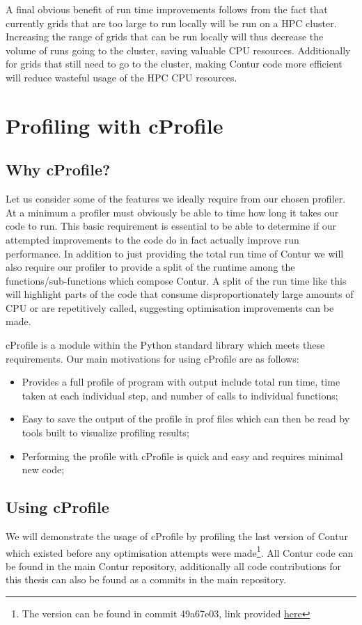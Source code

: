 A final obvious benefit of run time improvements follows from the fact that currently grids that are too large to run locally will be run on a HPC cluster. Increasing the range of grids that can be run locally will thus decrease the volume of runs going to the cluster, saving valuable CPU resources. Additionally for grids that still need to go to the cluster, making Contur code more efficient will reduce wasteful usage of the HPC CPU resources.

\section{Profiling with cProfile}

\subsection{Why cProfile?}
Let us consider some of the features we ideally require from our chosen profiler. At a minimum a profiler must obviously be able to time how long it takes our code to run. This basic requirement is essential to be able to determine if our attempted improvements to the code do in fact actually improve run performance. In addition to just providing the total run time of Contur we will also require our profiler to provide a split of the runtime among the functions/sub-functions which compose Contur. A split of the run time like this will highlight parts of the code that consume disproportionately large amounts of CPU or are repetitively called, suggesting optimisation improvements can be made.

cProfile\cite{cProfile} is a module within the Python standard library which meets these requirements. Our main motivations for using cProfile are as follows:

\begin{itemize}
\item Provides a full profile of program with output include total run time, time taken at each individual step, and number of calls to individual functions;
\item Easy to save the output of the profile in prof files which can then be read by tools built to visualize profiling results;
\item Performing the profile with cProfile is quick and easy and requires minimal new code;
\end{itemize}

\subsection{Using cProfile}
We will demonstrate the usage of cProfile by profiling the last version of Contur which existed before any optimisation attempts were made\footnote{The version can be found in commit 49a67e03, link provided \href{https://gitlab.com/hepcedar/contur/-/tree/49a67e039cf93c88b39dade3dfb7c5f03e780fb2}{here}}. All Contur code can be found in the main Contur repository\cite{contur_main}, additionally all code contributions for this thesis can also be found as a commits in the main repository. 

